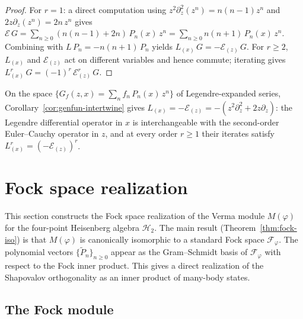 \documentclass[12pt]{amsart}
\theoremstyle{plain}
\theoremstyle{definition}
\newcommand{\Mf}{M(\varphi)}          %
\begin{document}
\begin{proof}
For $r=1$: a direct computation using $z^2\partial_z^2(z^n) = n(n-1)z^n$
and $2z\partial_z(z^n) = 2n\,z^n$ gives
$\mathcal{E}\,G = \sum_{n\geq 0}(n(n-1)+2n)\,P_n(x)\,z^n
= \sum_{n\geq 0} n(n+1)\,P_n(x)\,z^n$.
Combining with $L\,P_n = -n(n+1)\,P_n$ yields
$L_{(x)}\,G = -\mathcal{E}_{(z)}\,G$.
For $r\geq 2$, $L_{(x)}$ and $\mathcal{E}_{(z)}$ act on different
variables and hence commute; iterating gives
$L^r_{(x)}\,G = (-1)^r\,\mathcal{E}^r_{(z)}\,G$.
\end{proof}

On the space $\bigl\{G_f(z,x) = \sum_n f_n\,P_n(x)\,z^n\bigr\}$ of
Legendre-expanded series, Corollary~\ref{cor:genfun-intertwine} gives
$L_{(x)} = -\mathcal{E}_{(z)} = -(z^2\partial_z^2+2z\partial_z)$:
the Legendre differential operator in $x$ is interchangeable with the
second-order Euler--Cauchy operator in $z$, and at every order $r\geq 1$
their iterates satisfy $L^r_{(x)} = (-\mathcal{E}_{(z)})^r$.



\section{Fock space realization}
\label{sec:fock}

This section constructs the Fock space realization of the Verma
module $\Mf$ for the four-point Heisenberg algebra $\mathcal{H}_2$.
The main result (Theorem~\ref{thm:fock-iso}) is that $\Mf$ is canonically
isomorphic to a standard Fock space $\mathcal{F}_\varphi$.
The polynomial vectors $\{\tilde{P}_n\}_{n \geq 0}$ appear as the
Gram--Schmidt basis of $\mathcal{F}_\varphi$ with respect to the Fock
inner product.
This gives a direct realization of the Shapovalov orthogonality as
an inner product of many-body states.

\subsection{The Fock module}
\label{subsec:fock-def}
\end{document}
